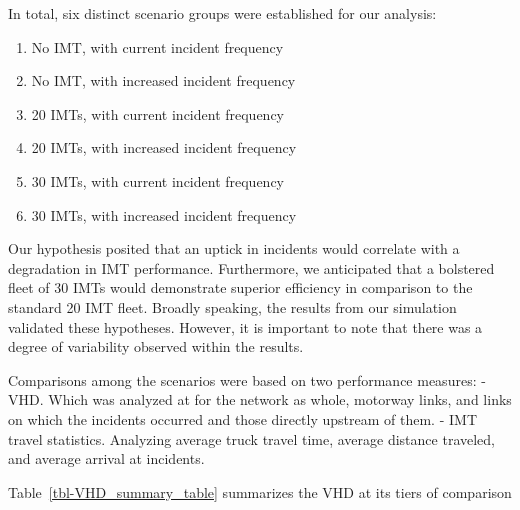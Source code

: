 \documentclass[fancy, oneside, mastersfancy, ms]{byuthesis}
\providecommand{\tightlist}{%
  \setlength{\itemsep}{0pt}\setlength{\parskip}{0pt}}\usepackage{longtable,booktabs,array}
\begin{document}
In total, six distinct scenario groups were established for our
analysis:

\begin{enumerate}
\def\labelenumi{\arabic{enumi}.}
\tightlist
\item
  No IMT, with current incident frequency
\item
  No IMT, with increased incident frequency
\item
  20 IMTs, with current incident frequency
\item
  20 IMTs, with increased incident frequency
\item
  30 IMTs, with current incident frequency
\item
  30 IMTs, with increased incident frequency
\end{enumerate}

Our hypothesis posited that an uptick in incidents would correlate with
a degradation in IMT performance. Furthermore, we anticipated that a
bolstered fleet of 30 IMTs would demonstrate superior efficiency in
comparison to the standard 20 IMT fleet. Broadly speaking, the results
from our simulation validated these hypotheses. However, it is important
to note that there was a degree of variability observed within the
results.

Comparisons among the scenarios were based on two performance measures:
- VHD. Which was analyzed at for the network as whole, motorway links,
and links on which the incidents occurred and those directly upstream of
them. - IMT travel statistics. Analyzing average truck travel time,
average distance traveled, and average arrival at incidents.

Table~\ref{tbl-VHD_summary_table} summarizes the VHD at its tiers of
comparison
\end{document}
